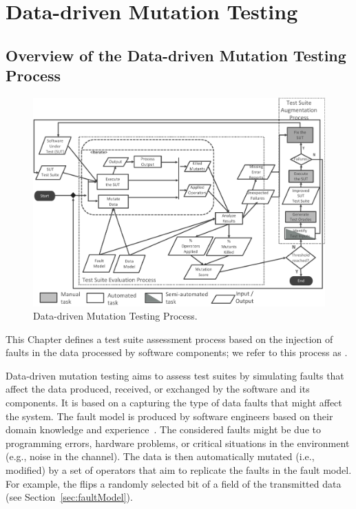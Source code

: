 
\chapter{Data-driven Mutation Testing}
\label{chapter:datamutation}


\section{Overview of the Data-driven Mutation Testing Process}
\label{sec:dataProcess}

	\begin{figure}
	\centering
		\includegraphics[width=\textwidth]{images/dataProcess}
		\caption{Data-driven Mutation Testing Process.}
		\label{fig:data:process}
	\end{figure}



This Chapter defines a test suite assessment process based on the injection of faults in the data processed by software components; we refer to this process as . 

Data-driven mutation testing aims to assess test suites by simulating faults that affect the data produced, received, or exchanged by the software and its components.
It is based on a  capturing the type of data faults that might affect the system. The fault model is produced by software engineers based on their domain knowledge and experience~\cite{di2015generating}. The considered faults might be due to programming errors, hardware problems, or critical situations in the environment (e.g., noise in the channel). The data is then automatically  mutated (i.e., modified) by a set of operators that aim to replicate the faults in the fault model. For example, the  flips a randomly selected bit of a field of the transmitted data (see Section~\ref{sec:faultModel}). 



